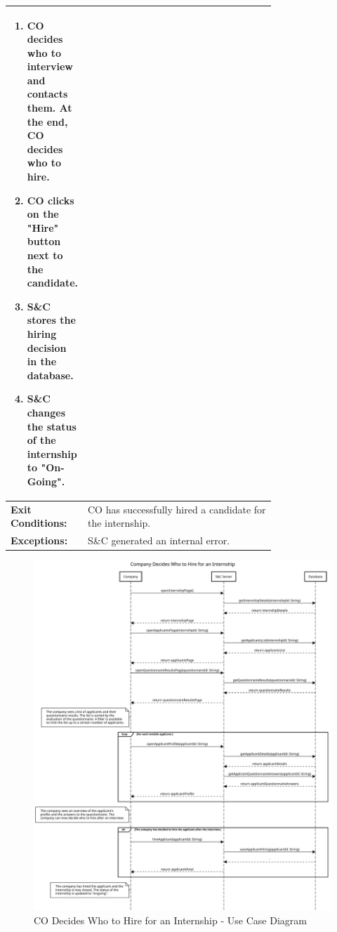 \begin{center}
\begin{longtable}{|l|p{0.75\linewidth}|}
\begin{enumerate}
                                         \item CO decides who to interview and contacts them. At the end, CO decides who to hire.
                                         \item CO clicks on the "Hire" button next to the candidate.
                                         \item S\&C stores the hiring decision in the database.
                                         \item S\&C changes the status of the internship to "On-Going".
                                     \end{enumerate} \\
        \hline
        \textbf{Exit Conditions:}  & CO has successfully hired a candidate for the internship.                               \\
        \hline
        \textbf{Exceptions:}       & S\&C generated an internal error.                                                       \\
        \hline
    \end{longtable}
\end{center}

\begin{figure}[H]
    \centering
    \includegraphics[width=1.0\textwidth]{Images/UC_14A.pdf}
    \caption{CO Decides Who to Hire for an Internship - Use Case Diagram}
    \label{fig:use-case-diagram-15}
\end{figure}

